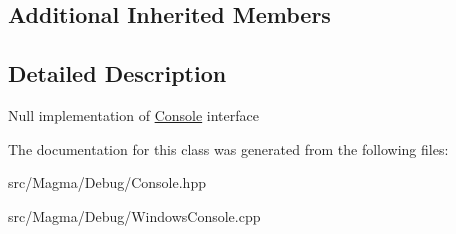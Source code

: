 \subsection*{Additional Inherited Members}


\subsection{Detailed Description}
Null implementation of \hyperlink{class_magma_1_1_console}{Console} interface 



The documentation for this class was generated from the following files\+:\begin{DoxyCompactItemize}
\item 
src/\+Magma/\+Debug/Console.\+hpp\item 
src/\+Magma/\+Debug/Windows\+Console.\+cpp\end{DoxyCompactItemize}
